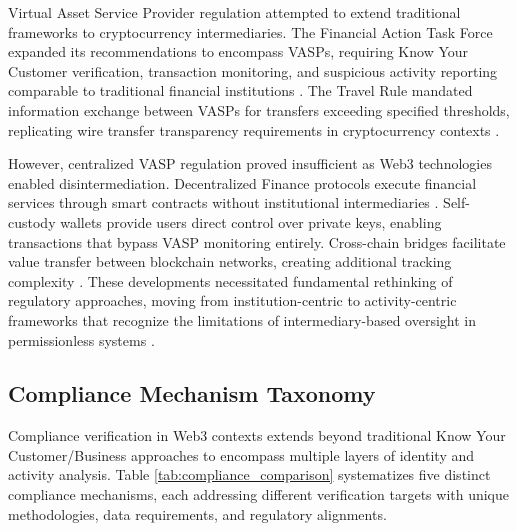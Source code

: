 \documentclass[conference,compsoc]{IEEEtran}
\begin{document}
Virtual Asset Service Provider regulation attempted to extend traditional frameworks to cryptocurrency intermediaries. The Financial Action Task Force expanded its recommendations to encompass VASPs, requiring Know Your Customer verification, transaction monitoring, and suspicious activity reporting comparable to traditional financial institutions \cite{financialactiontaskforcefatf2012internationalstandardscombating,force2021updatedguidanceriskbased}. The Travel Rule mandated information exchange between VASPs for transfers exceeding specified thresholds, replicating wire transfer transparency requirements in cryptocurrency contexts \cite{force2021opportunitieschallengesnew,pocher2022privacytransparencycbdcs}.

However, centralized VASP regulation proved insufficient as Web3 technologies enabled disintermediation. Decentralized Finance protocols execute financial services through smart contracts without institutional intermediaries \cite{harvey2021defifuturefinance,salami2021challengesapproachesregulating}. Self-custody wallets provide users direct control over private keys, enabling transactions that bypass VASP monitoring entirely. Cross-chain bridges facilitate value transfer between blockchain networks, creating additional tracking complexity \cite{zamyatin2021sokcommunicationdistributed,li2025blockchaincrosschainbridge}. These developments necessitated fundamental rethinking of regulatory approaches, moving from institution-centric to activity-centric frameworks that recognize the limitations of intermediary-based oversight in permissionless systems \cite{werbach2018trustverifywhy}.

\subsection{Compliance Mechanism Taxonomy}

Compliance verification in Web3 contexts extends beyond traditional Know Your Customer/Business approaches to encompass multiple layers of identity and activity analysis. Table \ref{tab:compliance_comparison} systematizes five distinct compliance mechanisms, each addressing different verification targets with unique methodologies, data requirements, and regulatory alignments.
\end{document}
